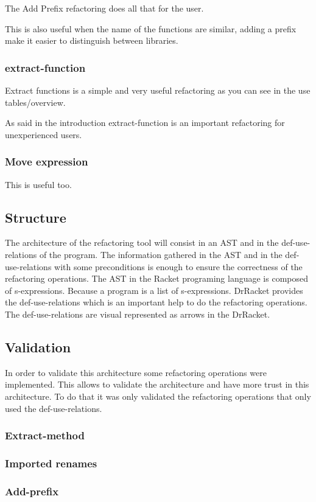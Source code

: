 The Add Prefix refactoring does all that for the user.

This is also useful when the name of the functions are similar, adding a prefix make it easier to distinguish between libraries.


\subsubsection{extract-function}

Extract functions is a simple and very useful refactoring as you can see in the use tables/overview. 

As said in the introduction extract-function is an important refactoring for unexperienced users.

\subsubsection{Move expression}

This is useful too.

\subsection{Structure}

The architecture of the refactoring tool will consist in an AST and in the def-use-relations of the program.
The information gathered in the AST and in the def-use-relations with some preconditions is enough to ensure the correctness of the refactoring operations.
The AST in the Racket programing language is composed of s-expressions. Because a program is a list of s-expressions.
DrRacket provides the def-use-relations which is an important help to do the refactoring operations. The def-use-relations are visual represented as arrows in the DrRacket.


\subsection{Validation}

In order to validate this architecture some refactoring operations were implemented. 
This allows to validate the architecture and have more trust in this architecture.
To do that it was only validated the refactoring operations that only used the def-use-relations.

\subsubsection{Extract-method}
\subsubsection{Imported renames}
\subsubsection{Add-prefix}

